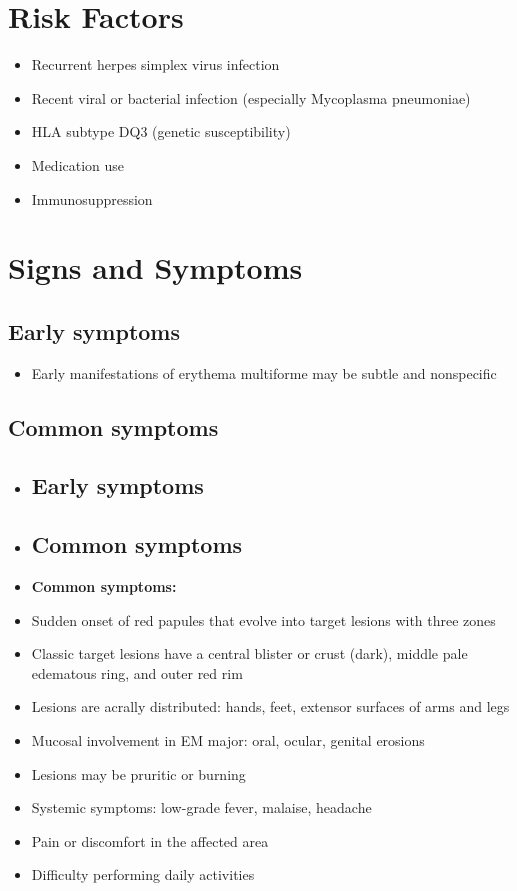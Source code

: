 \section{Risk Factors}

\begin{itemize}[noitemsep]
  \item Recurrent herpes simplex virus infection
  \item Recent viral or bacterial infection (especially Mycoplasma pneumoniae)
  \item HLA subtype DQ3 (genetic susceptibility)
  \item Medication use
  \item Immunosuppression
\end{itemize}

\section{Signs and Symptoms}

\subsection{Early symptoms}
\begin{itemize}[noitemsep]
  \item Early manifestations of erythema multiforme may be subtle and nonspecific
\end{itemize}

\subsection{Common symptoms}
\begin{itemize}[noitemsep]
  \item \subsection{Early symptoms}
  \item \subsection{Common symptoms}
  \item \textbf{Common symptoms:}
  \item Sudden onset of red papules that evolve into target lesions with three zones
  \item Classic target lesions have a central blister or crust (dark), middle pale edematous ring, and outer red rim
  \item Lesions are acrally distributed: hands, feet, extensor surfaces of arms and legs
  \item Mucosal involvement in EM major: oral, ocular, genital erosions
  \item Lesions may be pruritic or burning
  \item Systemic symptoms: low-grade fever, malaise, headache
  \item Pain or discomfort in the affected area
  \item Difficulty performing daily activities
\end{itemize}

